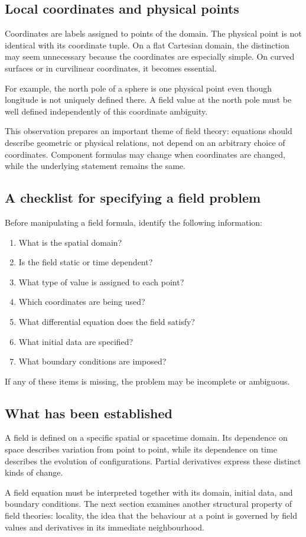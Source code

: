 \subsection{Local coordinates and physical points}

Coordinates are labels assigned to points of the domain. The physical point is not identical with its coordinate tuple. On a flat Cartesian domain, the distinction may seem unnecessary because the coordinates are especially simple. On curved surfaces or in curvilinear coordinates, it becomes essential.

For example, the north pole of a sphere is one physical point even though longitude is not uniquely defined there. A field value at the north pole must be well defined independently of this coordinate ambiguity.

This observation prepares an important theme of field theory: equations should describe geometric or physical relations, not depend on an arbitrary choice of coordinates. Component formulas may change when coordinates are changed, while the underlying statement remains the same.

\subsection{A checklist for specifying a field problem}

Before manipulating a field formula, identify the following information:

\begin{enumerate}
    \item What is the spatial domain?
    \item Is the field static or time dependent?
    \item What type of value is assigned to each point?
    \item Which coordinates are being used?
    \item What differential equation does the field satisfy?
    \item What initial data are specified?
    \item What boundary conditions are imposed?
\end{enumerate}

If any of these items is missing, the problem may be incomplete or ambiguous.

\subsection{What has been established}

A field is defined on a specific spatial or spacetime domain. Its dependence on space describes variation from point to point, while its dependence on time describes the evolution of configurations. Partial derivatives express these distinct kinds of change.

A field equation must be interpreted together with its domain, initial data, and boundary conditions. The next section examines another structural property of field theories: locality, the idea that the behaviour at a point is governed by field values and derivatives in its immediate neighbourhood.